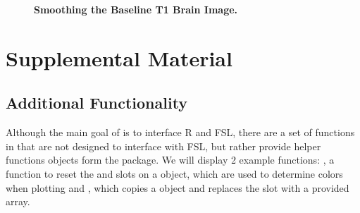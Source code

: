 \begin{figure}
\hfill
\caption{{\bf Smoothing the Baseline T1 Brain Image.}  }
\label{fig:smooth}
\end{figure}


\section{Supplemental Material}

\subsection{Additional  Functionality}
Although the main goal of  is to interface R and FSL, there are a set of functions in  that are not designed to interface with FSL, but rather provide helper functions  objects form the  package.  We will display 2 example functions: , a function to reset the  and  slots on a  object, which are used to determine colors when plotting and , which copies a  object and replaces the  slot with a provided array. 

